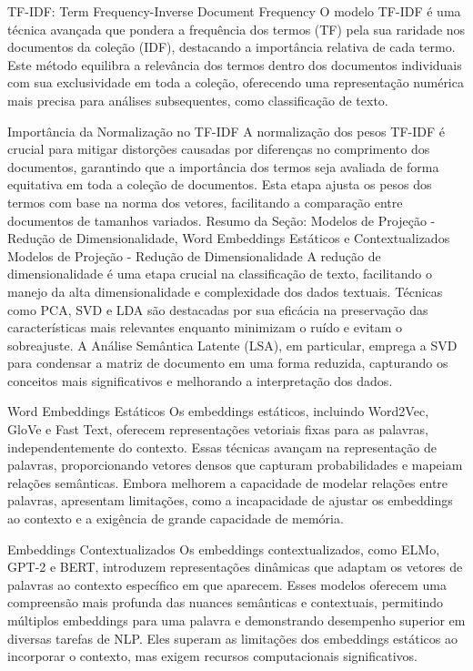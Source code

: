 {TF-IDF: Term Frequency-Inverse Document Frequency
O modelo TF-IDF é uma técnica avançada que pondera a frequência dos termos (TF) pela sua raridade nos documentos da coleção (IDF), destacando a importância relativa de cada termo. Este método equilibra a relevância dos termos dentro dos documentos individuais com sua exclusividade em toda a coleção, oferecendo uma representação numérica mais precisa para análises subsequentes, como classificação de texto.

Importância da Normalização no TF-IDF
A normalização dos pesos TF-IDF é crucial para mitigar distorções causadas por diferenças no comprimento dos documentos, garantindo que a importância dos termos seja avaliada de forma equitativa em toda a coleção de documentos. Esta etapa ajusta os pesos dos termos com base na norma dos vetores, facilitando a comparação entre documentos de tamanhos variados.
Resumo da Seção: Modelos de Projeção - Redução de Dimensionalidade, Word Embeddings Estáticos e Contextualizados
Modelos de Projeção - Redução de Dimensionalidade
A redução de dimensionalidade é uma etapa crucial na classificação de texto, facilitando o manejo da alta dimensionalidade e complexidade dos dados textuais. Técnicas como PCA, SVD e LDA são destacadas por sua eficácia na preservação das características mais relevantes enquanto minimizam o ruído e evitam o sobreajuste. A Análise Semântica Latente (LSA), em particular, emprega a SVD para condensar a matriz de documento em uma forma reduzida, capturando os conceitos mais significativos e melhorando a interpretação dos dados.

Word Embeddings Estáticos
Os embeddings estáticos, incluindo Word2Vec, GloVe e Fast Text, oferecem representações vetoriais fixas para as palavras, independentemente do contexto. Essas técnicas avançam na representação de palavras, proporcionando vetores densos que capturam probabilidades e mapeiam relações semânticas. Embora melhorem a capacidade de modelar relações entre palavras, apresentam limitações, como a incapacidade de ajustar os embeddings ao contexto e a exigência de grande capacidade de memória.

Embeddings Contextualizados
Os embeddings contextualizados, como ELMo, GPT-2 e BERT, introduzem representações dinâmicas que adaptam os vetores de palavras ao contexto específico em que aparecem. Esses modelos oferecem uma compreensão mais profunda das nuances semânticas e contextuais, permitindo múltiplos embeddings para uma palavra e demonstrando desempenho superior em diversas tarefas de NLP. Eles superam as limitações dos embeddings estáticos ao incorporar o contexto, mas exigem recursos computacionais significativos.

}
